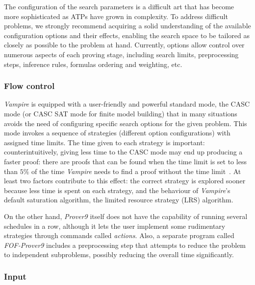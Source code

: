 \documentclass[12pt]{amsart}
\theoremstyle{definition}
\begin{document}
The configuration of the search parameters is a difficult art that has become more sophisticated as ATPs have grown in complexity. To address difficult problems, we strongly recommend acquiring a solid understanding of the available configuration options and their effects, enabling the search space to be tailored as closely as possible to the problem at hand. Currently, options allow control over numerous aspects of each proving stage, including search limits, preprocessing steps, inference rules, formulas ordering and weighting, etc.

\subsubsection{Flow control}\label{flow control}
\emph{Vampire} is equipped with a user-friendly and powerful standard mode, the CASC mode (or CASC SAT mode for finite model building) that in many situations avoids the need of configuring specific search options for the given problem. This mode invokes a sequence of strategies (different option configurations) with assigned time limits. The time given to each strategy is important: counterintuitively, giving less time to the CASC mode may end up producing a faster proof: there are proofs that can be found when the time limit is set to less than $5\%$ of the time \emph{Vampire} needs to find a proof without the time limit~\cite{DBLP:conf/cav/KovacsV13}. At least two factors contribute to this effect: the correct strategy is explored sooner because less time is spent on each strategy, and the behaviour of \emph{Vampire}'s default saturation algorithm, the limited resource strategy (LRS) algorithm.

On the other hand, \emph{Prover9} itself does not have the capability of running several schedules in a row, although it lets the user implement some rudimentary strategies through commands called \emph{actions}. Also, a separate program called \emph{FOF-Prover9} includes a preprocessing step that attempts to reduce the problem to independent subproblems, possibly reducing the overall time significantly.

\subsubsection{Input}\label{input}
\end{document}
